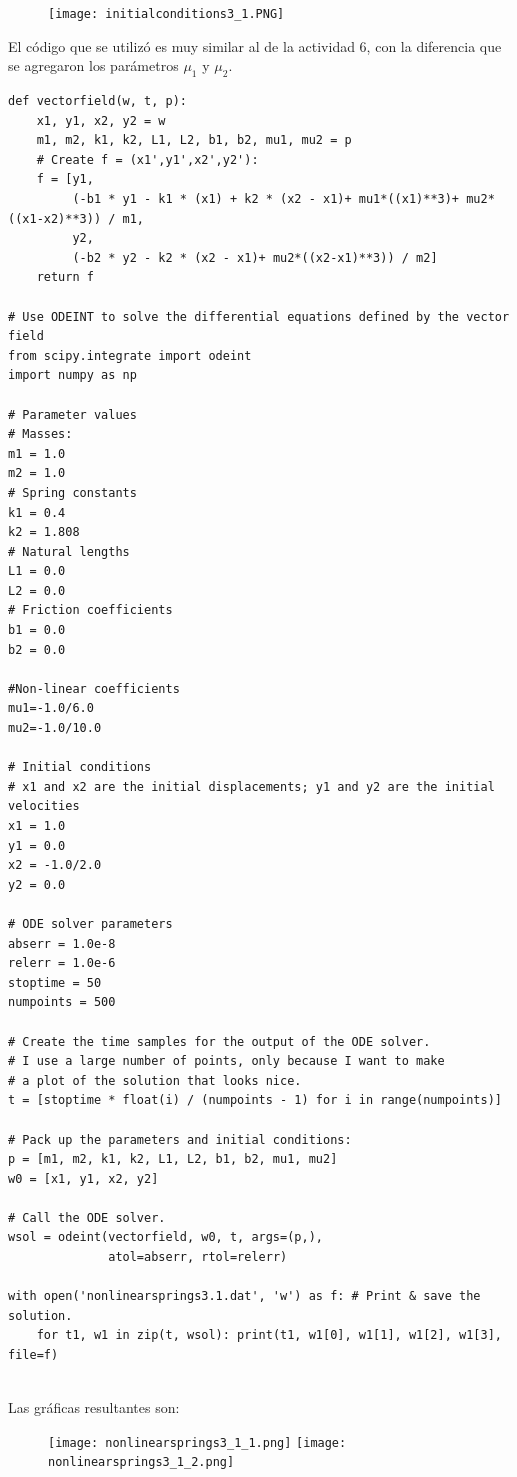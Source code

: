 \documentclass[a4paper]{article}
\begin{document}
\begin{figure}[ht!]
\centering
\texttt{[image: initialconditions3\_1.PNG]}
\end{figure}

El código que se utilizó es muy similar al de la actividad 6, con la diferencia que se agregaron los parámetros $\mu_1$ y $\mu_2$.

\begin{verbatim}
def vectorfield(w, t, p):
    x1, y1, x2, y2 = w
    m1, m2, k1, k2, L1, L2, b1, b2, mu1, mu2 = p
    # Create f = (x1',y1',x2',y2'):
    f = [y1,
         (-b1 * y1 - k1 * (x1) + k2 * (x2 - x1)+ mu1*((x1)**3)+ mu2*((x1-x2)**3)) / m1,
         y2,
         (-b2 * y2 - k2 * (x2 - x1)+ mu2*((x2-x1)**3)) / m2]
    return f

# Use ODEINT to solve the differential equations defined by the vector field
from scipy.integrate import odeint
import numpy as np

# Parameter values
# Masses:
m1 = 1.0
m2 = 1.0
# Spring constants
k1 = 0.4
k2 = 1.808
# Natural lengths
L1 = 0.0
L2 = 0.0
# Friction coefficients
b1 = 0.0
b2 = 0.0

#Non-linear coefficients
mu1=-1.0/6.0
mu2=-1.0/10.0

# Initial conditions
# x1 and x2 are the initial displacements; y1 and y2 are the initial velocities
x1 = 1.0
y1 = 0.0
x2 = -1.0/2.0
y2 = 0.0

# ODE solver parameters
abserr = 1.0e-8
relerr = 1.0e-6
stoptime = 50
numpoints = 500

# Create the time samples for the output of the ODE solver.
# I use a large number of points, only because I want to make
# a plot of the solution that looks nice.
t = [stoptime * float(i) / (numpoints - 1) for i in range(numpoints)]

# Pack up the parameters and initial conditions:
p = [m1, m2, k1, k2, L1, L2, b1, b2, mu1, mu2]
w0 = [x1, y1, x2, y2]

# Call the ODE solver.
wsol = odeint(vectorfield, w0, t, args=(p,),
              atol=abserr, rtol=relerr)

with open('nonlinearsprings3.1.dat', 'w') as f: # Print & save the solution. 
    for t1, w1 in zip(t, wsol): print(t1, w1[0], w1[1], w1[2], w1[3], file=f)
    

\end{verbatim}

\newpage
Las gráficas resultantes son:
\begin{figure}[ht!]
\centering
\texttt{[image: nonlinearsprings3\_1\_1.png]}
\texttt{[image: nonlinearsprings3\_1\_2.png]}
\end{figure}
\end{document}
